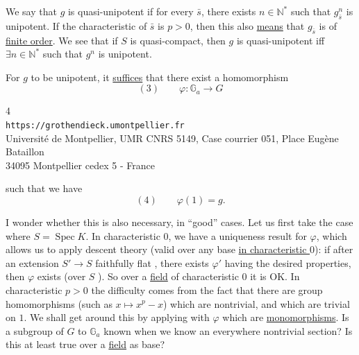 We say that $g$ is quasi-unipotent if for every $\bar s$, there exists
$n\in\mathbb N^*$ such that $g_{\bar s}^{n}$ is unipotent.
If the characteristic of $\bar s$ is $p>0$, then this also \uline{means} that
$g_{\bar s}$ is of \uline{finite order}. We see that if $S$ is
quasi-compact, then $g$ is quasi-unipotent iff
$\exists n\in\mathbb N^*$ such that $g^n$ is unipotent.


 For $g$ to be unipotent, it \uline{suffices} that there exist a homomorphism
\[
(3)\qquad \varphi:\mathbb G_a\longrightarrow G
\]

\begin{center}
\small
4\\
\texttt{https://grothendieck.umontpellier.fr}\\
Université de Montpellier, UMR CNRS 5149, Case courrier 051, Place Eugène Bataillon\\
34095 Montpellier cedex 5 - France
\end{center}


such that we have
\[
(4)\qquad \varphi(1)=g.
\]

I wonder whether this is also necessary, in ``good'' cases. Let us first take the
case where $S=\operatorname{Spec}K$. In characteristic $0$, we have a uniqueness
result for $\varphi$, which allows us to apply descent theory
(valid over any base \uline{in characteristic $0$}): if after an extension
$S'\longrightarrow S$ faithfully flat , there exists $\varphi'$ having
the desired properties, then $\varphi$ exists
(over $S$ ).
So over a \uline{field} of characteristic $0$ it is OK. In characteristic $p>0$ the difficulty
comes from the fact that there are group homomorphisms
(such as $x\mapsto x^p-x$) which are  nontrivial, and which are
trivial on $1$. We shall get around this  by applying
 with $\varphi$ which are \uline{monomorphisms}.
 
Is a subgroup of $G$  to $\mathbb G_a$ known when
we know an everywhere nontrivial section? Is this at least true over a
\uline{field} as base?

